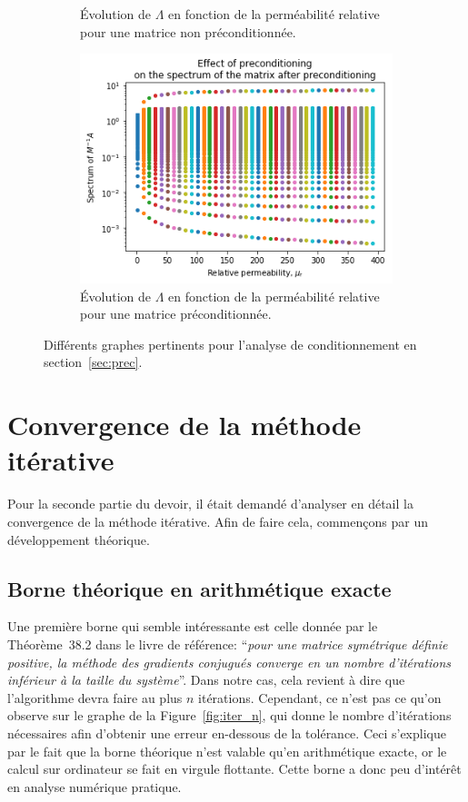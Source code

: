 \documentclass[11pt]{article}
\begin{document}
\begin{figure}[H]
\begin{subfigure}[t]{0.32\textwidth}
		\caption{Évolution de $\Lambda$ en fonction de la perméabilité relative pour une matrice non préconditionnée.}
		\label{fig:mur_spec}
	\end{subfigure}\hfill
	\begin{subfigure}[t]{0.32\textwidth}
		\centering
		\includegraphics[width=\linewidth]{mur_spec_prec.png}
		\caption{Évolution de $\Lambda$ en fonction de la perméabilité relative pour une matrice préconditionnée.}
		\label{fig:mur_spec_prec}
	\end{subfigure}
	\caption{Différents graphes pertinents pour l'analyse de conditionnement en section~\ref{sec:prec}.}
	\label{fig:prec_effect}
\end{figure}

\section{Convergence de la méthode itérative}
\label{sec:conv}
Pour la seconde partie du devoir, il était demandé d'analyser en détail la convergence de la méthode itérative. Afin de faire cela, commençons par un développement théorique.
\subsection{Borne théorique en arithmétique exacte}
Une première borne qui semble intéressante est celle donnée par le Théorème~38.2 dans le livre de référence: \foreignquote{french}{\emph{pour une matrice symétrique définie positive, la méthode des gradients conjugués converge en un nombre d'itérations inférieur à la taille du système}}. Dans notre cas, cela revient à dire que l'algorithme devra faire au plus $n$ itérations. Cependant, ce n'est pas ce qu'on observe sur le graphe de la Figure~\ref{fig:iter_n}, qui donne le nombre d'itérations nécessaires afin d'obtenir une erreur en-dessous de la tolérance. Ceci s'explique par le fait que la borne théorique n'est valable qu'en arithmétique exacte, or le calcul sur ordinateur se fait en virgule flottante. Cette borne a donc peu d'intérêt en analyse numérique pratique.
\end{document}
